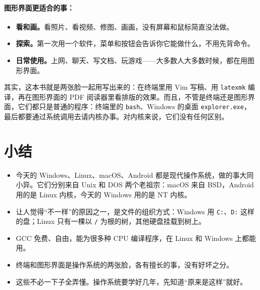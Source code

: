 \paragraph{图形界面更适合的事：}
\begin{itemize}
  \item \textbf{看和画。}看照片、看视频、修图、画画，没有屏幕和鼠标简直没法做。
  \item \textbf{探索。}第一次用一个软件，菜单和按钮会告诉你它能做什么，不用先背命令。
  \item \textbf{日常使用。}上网、聊天、写文档、玩游戏——大多数人大多数时候，都在用图形界面。
\end{itemize}

其实，这本书就是两张脸一起用写出来的：在终端里用 Vim 写稿、用 \texttt{latexmk} 编译，再在图形界面的 PDF 阅读器里看排版的效果。而且，不管是终端还是图形界面，它们都只是普通的程序：终端里的 \texttt{bash}、Windows 的桌面 \texttt{explorer.exe}，最后都要通过系统调用去请内核办事。对内核来说，它们没有任何区别。

\section{小结}

\begin{itemize}
  \item 今天的 Windows、Linux、macOS、Android 都是现代操作系统，做的事大同小异。它们分别来自 Unix 和 DOS 两个老祖宗：macOS 来自 BSD，Android 用的是 Linux 内核，今天的 Windows 用的是 NT 内核。
  \item 让人觉得“不一样”的原因之一，是文件的组织方式：Windows 用 \texttt{C:}、\texttt{D:} 这样的盘；Linux 只有一棵以 \texttt{/} 为根的树，其他硬盘挂载到树上。
  \item GCC 免费、自由，能为很多种 CPU 编译程序，在 Linux 和 Windows 上都能用。
  \item 终端和图形界面是操作系统的两张脸，各有擅长的事，没有好坏之分。
  \item 这些不必一下子全弄懂。操作系统要学好几年，先知道“原来是这样”就好。
\end{itemize}
